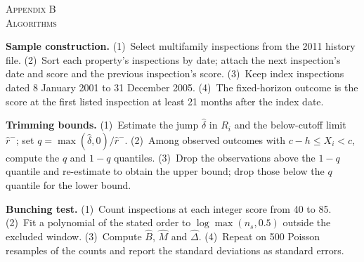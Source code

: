\documentclass[10pt,twocolumn,letterpaper]{article}
\newcommand{\runhead}[1]{\par\vspace{0.35ex}\noindent\textbf{#1}\hspace{0.35em}}
\newcommand{\appsection}[2]{\par\vspace{2.2ex}\begin{center}\textsc{Appendix #1}\\\textsc{#2}\end{center}\vspace{0.6ex}}
\begin{document}
\begin{table}[h]
\caption{Estimator validation on synthetic data}\label{tab:sim}
\centering\footnotesize

\end{table}

\appsection{B}{Algorithms}
\runhead{Sample construction.} (1)~Select multifamily inspections from the 2011 history file. (2)~Sort each property's inspections by date; attach the next inspection's date and score and the previous inspection's score. (3)~Keep index inspections dated 8 January 2001 to 31 December 2005. (4)~The fixed-horizon outcome is the score at the first listed inspection at least 21 months after the index date.

\runhead{Trimming bounds.} (1)~Estimate the jump $\hat\delta$ in $R_i$ and the below-cutoff limit $\hat r^-$; set $q=\max(\hat\delta,0)/\hat r^-$. (2)~Among observed outcomes with $c-h\le X_i<c$, compute the $q$ and $1-q$ quantiles. (3)~Drop the observations above the $1-q$ quantile and re-estimate to obtain the upper bound; drop those below the $q$ quantile for the lower bound.

\runhead{Bunching test.} (1)~Count inspections at each integer score from 40 to 85. (2)~Fit a polynomial of the stated order to $\log\max(n_s,0.5)$ outside the excluded window. (3)~Compute $\hat B$, $\hat M$ and $\hat\Delta$. (4)~Repeat on 500 Poisson resamples of the counts and report the standard deviations as standard errors.
\end{document}

